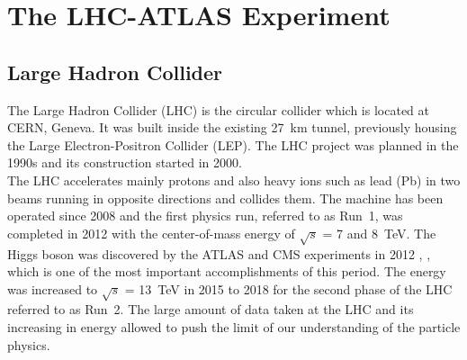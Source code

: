 \chapter{The LHC-ATLAS Experiment}
\label{chap:LHCATLAS}
\section{Large Hadron Collider}
The Large Hadron Collider (LHC) is the circular collider which is located at CERN, Geneva. It was built inside the existing 27~km tunnel, previously housing the Large Electron-Positron Collider (LEP). The LHC project was planned in the 1990s and its construction started in 2000. \\
The LHC accelerates mainly protons and also heavy ions such as lead (Pb) in two beams running in opposite directions and collides them. 
The machine has been operated since 2008 and the first physics run, referred to as Run~1, was completed in 2012 with the center-of-mass energy of $\sqrt{s}$ = 7 and 8~TeV. The Higgs boson was discovered by the ATLAS and CMS experiments in 2012 \cite{HIGG-2012-27}, \cite{CMS-HIG-12-028}, which is one of the most important accomplishments of this period. The energy was increased to $\sqrt{s}$ = 13~TeV in 2015 to 2018 for the second phase of the LHC referred to as Run~2. 
The large amount of data taken at the LHC and its increasing in energy allowed to push the limit of our understanding of the particle physics. 


